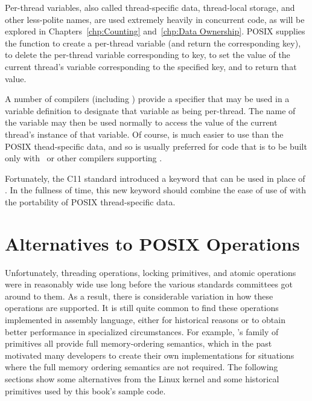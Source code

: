 Per-thread variables, also called thread-specific data, thread-local
storage, and other less-polite names, are used extremely
heavily in concurrent code, as will be explored in
Chapters~\ref{chp:Counting} and~\ref{chp:Data Ownership}.
POSIX supplies the  function to create a
per-thread variable (and return the corresponding key),
 to delete the per-thread variable corresponding
to key,
 to set the value of the current thread's
variable corresponding to the specified key,
and  to return that value.

A number of compilers (including \GCC) provide a  specifier
that may be used in a variable definition to designate that variable
as being per-thread.
The name of the variable may then be used normally to access the
value of the current thread's instance of that variable.
Of course,  is much easier to use than the POSIX
thead-specific data, and so  is usually preferred for
code that is to be built only with \GCC\ or other compilers supporting
.

Fortunately, the C11 standard introduced a  keyword
that can be used in place of .
In the fullness of time, this new keyword should combine the ease of use
of  with the portability of POSIX thread-specific data.

\section{Alternatives to POSIX Operations}
\label{sec:toolsoftrade:Alternatives to POSIX Operations}

Unfortunately, threading operations, locking primitives, and atomic
operations were in reasonably wide use long before the various standards
committees got around to them.
As a result, there is considerable variation in how these operations
are supported.
It is still quite common to find these operations implemented in
assembly language, either for historical reasons or to obtain better
performance in specialized circumstances.
For example, \GCC's  family of primitives all provide full
memory-ordering semantics, which in the past motivated many developers
to create their own implementations for situations where the full memory
ordering semantics are not required.
The following sections show some alternatives from the Linux kernel
and some historical primitives used by this book's sample code.

